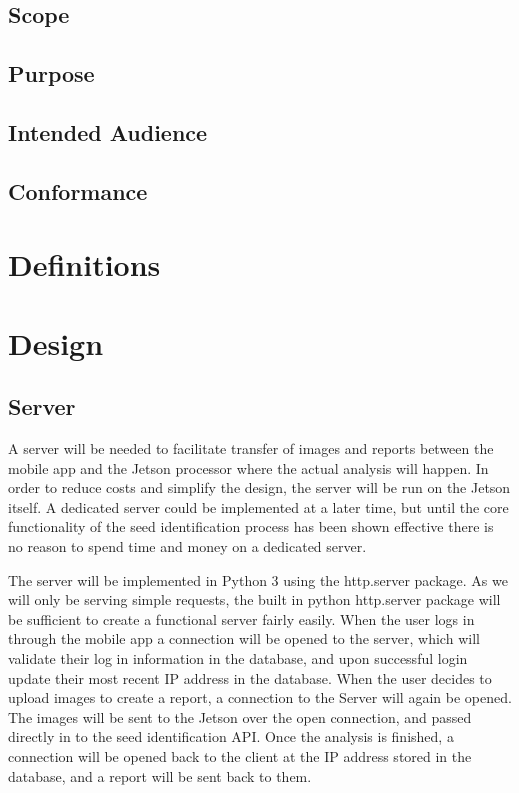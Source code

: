 \documentclass[onecolumn, draftclsnofoot,10pt, compsoc]{IEEEtran}
\begin{document}
    \subsection{Scope}
    \subsection{Purpose}
    \subsection{Intended Audience}
    \subsection{Conformance}

\section{Definitions}


\section{Design}
    \subsection{Server}
        A server will be needed to facilitate transfer of images and reports between the mobile app and the Jetson processor where the actual analysis will happen.
    In order to reduce costs and simplify the design, the server will be run on the Jetson itself.
    A dedicated server could be implemented at a later time, but until the core functionality of the seed identification process has been shown effective there is no reason to spend time and money on a dedicated server.

    The server will be implemented in Python 3 using the http.server package.
    As we will only be serving simple requests, the built in python http.server package will be sufficient to create a functional server fairly easily.
    When the user logs in through the mobile app a connection will be opened to the server, which will validate their log in information in the database, and upon successful login update their most recent IP address in the database.
    When the user decides to upload images to create a report, a connection to the Server will again be opened.
    The images will be sent to the Jetson over the open connection, and passed directly in to the seed identification API.
    Once the analysis is finished, a connection will be opened back to the client at the IP address stored in the database, and a report will be sent back to them.
\end{document}
